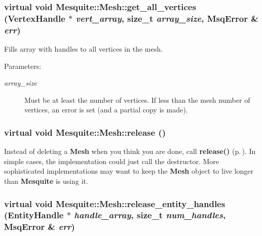 \documentclass[letter]{report}
\begin{document}
\subsubsection{\setlength{\rightskip}{0pt plus 5cm}virtual void Mesquite::Mesh::get\_\-all\_\-vertices (Vertex\-Handle $\ast$ {\em vert\_\-array}, size\_\-t {\em array\_\-size}, {\bf Msq\-Error} \& {\em err})\hspace{0.3cm}{\tt  [pure virtual]}}\label{classMesquite_1_1Mesh_a3}


Fills array with handles to all vertices in the mesh.

\begin{Desc}
\item[Parameters: ]\par
\begin{description}
\item[{\em 
array\_\-size}]Must be at least the number of vertices. If less than the mesh number of vertices, an error is set (and a partial copy is made). \end{description}
\end{Desc}


\subsubsection{\setlength{\rightskip}{0pt plus 5cm}virtual void Mesquite::Mesh::release ()\hspace{0.3cm}{\tt  [pure virtual]}}\label{classMesquite_1_1Mesh_a23}


Instead of deleting a {\bf Mesh} when you think you are done, call {\bf release()} {\rm (p.\,\pageref{classMesquite_1_1Mesh_a23})}. In simple cases, the implementation could just call the destructor. More sophisticated implementations may want to keep the {\bf Mesh} object to live longer than {\bf Mesquite} is using it. 

\subsubsection{\setlength{\rightskip}{0pt plus 5cm}virtual void Mesquite::Mesh::release\_\-entity\_\-handles ({\bf Entity\-Handle} $\ast$ {\em handle\_\-array}, size\_\-t {\em num\_\-handles}, {\bf Msq\-Error} \& {\em err})\hspace{0.3cm}{\tt  [pure virtual]}}\label{classMesquite_1_1Mesh_a22}
\end{document}
